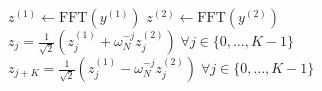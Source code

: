 \begin{algorithm}[htpb!]
	\caption{FFT}
	{
		$z^{(1)} \gets \text{FFT}(y^{(1)})$\;
		$z^{(2)} \gets \text{FFT}(y^{(2)})$\;
		$z_j = \frac{1}{\sqrt {2}} \left(z^{(1)}_j + \omega_N^{-j} z^{(2)}_j\right) \; \forall j\in \{0, \dots, K - 1\}$\;
		$z_{j+K} = \frac{1}{\sqrt {2}} \left(z^{(1)}_j - \omega_N^{-j} z^{(2)}_j\right) \; \forall j\in \{0, \dots, K - 1\}$\;
		\;
	}
	{
		\;
	}
\end{algorithm}